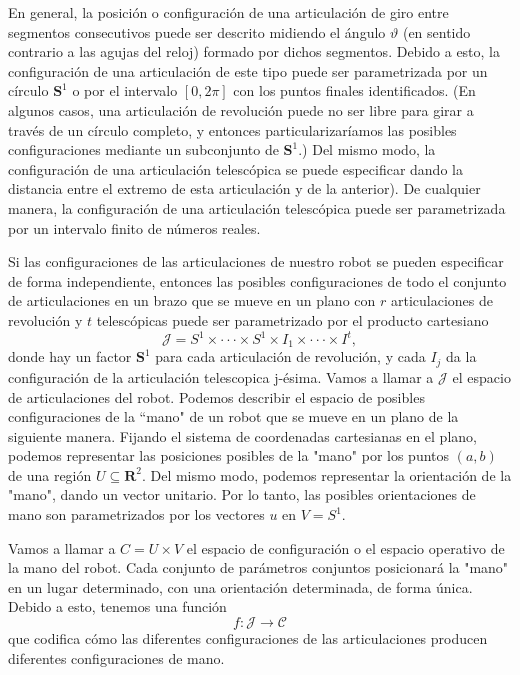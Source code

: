 En general, la posición o configuración de una articulación de giro entre segmentos consecutivos puede ser descrito midiendo el ángulo $\vartheta$ (en sentido contrario a las agujas del reloj) formado por dichos segmentos. Debido a esto, la configuración de una articulación de este tipo puede ser parametrizada por un círculo $\mathbf{S}^1$ o por el intervalo $[0, 2\pi]$ con los puntos finales identificados. (En algunos casos, una articulación de revolución puede no ser libre para girar a través de un círculo completo, y entonces particularizaríamos las posibles configuraciones mediante un subconjunto de $\mathbf{S}^1$.) 
Del mismo modo, la configuración de una articulación telescópica se puede especificar dando la distancia entre el extremo de esta articulación y de la anterior). De cualquier manera, la configuración de una articulación telescópica puede ser parametrizada por un intervalo finito de números reales.

Si las configuraciones de las articulaciones de nuestro robot se pueden especificar de forma independiente, entonces las posibles configuraciones de todo el conjunto de articulaciones en un brazo que se mueve en un plano con $r$ articulaciones de revolución y $t$ telescópicas puede ser parametrizado por el producto cartesiano
$$\mathcal{J}= S^{1}\times\cdot\cdot\cdot\times S^{1}\times I_{1}\times\cdot\cdot\cdot\times I^{t}, $$
donde hay un factor $\mathbf{S}^1$ para cada articulación de revolución, y cada $I_{j}$ da la configuración de la articulación telescopica j-ésima. Vamos a llamar a $\mathcal{J}$ el espacio de articulaciones del robot. 
Podemos describir el espacio de posibles configuraciones de la ``mano" de un robot que se mueve en un plano de la siguiente manera. Fijando el sistema de coordenadas cartesianas en el plano, podemos representar las posiciones posibles de la "mano" por los puntos $(a, b)$ de una región $U \subseteq  \mathbf{R}^{2}$. Del mismo modo, podemos representar la orientación de la "mano", dando un vector unitario. Por lo tanto, las posibles orientaciones de mano son parametrizados por los vectores $u$ en $V = S^{1}$. 

Vamos a llamar a $C = U \times V$  el espacio de configuración o el espacio operativo de la mano del robot.
Cada conjunto de parámetros conjuntos posicionará la "mano" en un lugar determinado, con una orientación determinada, de forma única. Debido a esto, tenemos una función
$$ f : \mathcal{J} \longrightarrow \mathcal{C}$$
que codifica cómo las diferentes configuraciones de las articulaciones producen diferentes configuraciones de mano.

